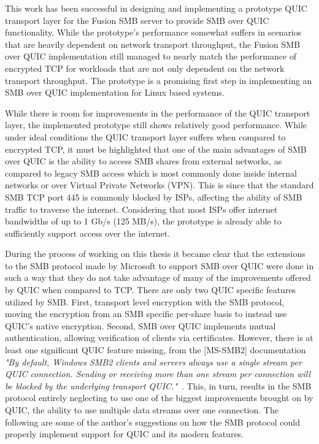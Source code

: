 \documentclass[english, 12pt, a4paper, elec, utf8, a-2b, online]{aaltothesis}
\begin{document}
This work has been successful in designing and implementing a prototype QUIC transport layer
for the Fusion SMB server to provide SMB over QUIC functionality.
While the prototype's performance somewhat suffers in scenarios that are heavily dependent
on network transport throughput, the Fusion SMB over QUIC implementation still managed to
nearly match the performance of encrypted TCP for workloads that are not only dependent
on the network transport throughput. The prototype is a promising first step in implementing an SMB over QUIC
implementation for Linux based systems.

While there is room for improvements in the performance of the QUIC transport layer,
the implemented prototype still shows relatively good performance. While under ideal
conditions the QUIC transport layer suffers when compared to encrypted TCP, it must be highlighted
that one of the main advantages of SMB over QUIC is the ability to access SMB shares from
external networks, as compared to legacy SMB access which is most commonly
done inside internal networks or over Virtual Private Networks (VPN). This is since
that the standard SMB TCP port 445 is commonly blocked by ISPs, affecting the ability
of SMB traffic to traverse the internet. Considering that
most ISPs offer internet bandwidths of up to 1 Gb/s (125 MB/s), the prototype is
already able to sufficiently support access over the internet.

During the process of working on this thesis it became clear that the extensions
to the SMB protocol made by Microsoft to support SMB over QUIC were done in such a way
that they do not take advantage of many of the improvements offered by QUIC when compared
to TCP. There are only two QUIC specific features utilized by SMB. First, transport level
encryption with the SMB protocol, moving the encryption from an SMB specific per-share basis to
instead use QUIC's native encryption. Second, SMB over QUIC implements mutual
authentication, allowing verification of clients via certificates. However, there is
at least one significant QUIC feature missing, from
the [MS-SMB2] documentation \textit{"By default, Windows SMB2 clients and servers always use a single stream per QUIC connection.
Sending or receiving more than one stream per connection will be blocked by the underlying transport
QUIC."}~\cite{smb2}. This, in turn, results in the SMB protocol entirely neglecting
to use one of the biggest improvements brought on by QUIC, the ability to use
multiple data streams over one connection. The following are some of the author's suggestions
on how the SMB protocol could properly implement support for QUIC and its
modern features.
\end{document}
